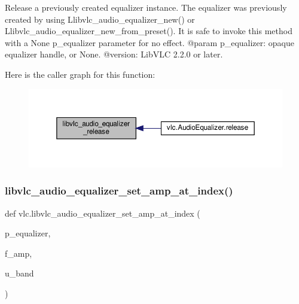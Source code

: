 \begin{DoxyVerb}Release a previously created equalizer instance.
The equalizer was previously created by using L{libvlc_audio_equalizer_new}() or
L{libvlc_audio_equalizer_new_from_preset}().
It is safe to invoke this method with a None p_equalizer parameter for no effect.
@param p_equalizer: opaque equalizer handle, or None.
@version: LibVLC 2.2.0 or later.
\end{DoxyVerb}
 Here is the caller graph for this function\+:
\nopagebreak
\begin{figure}[H]
\begin{center}
\leavevmode
\includegraphics[width=350pt]{namespacevlc_ae82eed728fae30f533e3bdaaeeb2fb24_icgraph}
\end{center}
\end{figure}
\mbox{\label{namespacevlc_afa112c9fa2e01582526543f4cc824132}} 
\subsubsection{\texorpdfstring{libvlc\+\_\+audio\+\_\+equalizer\+\_\+set\+\_\+amp\+\_\+at\+\_\+index()}{libvlc\_audio\_equalizer\_set\_amp\_at\_index()}}
{\footnotesize\ttfamily def vlc.\+libvlc\+\_\+audio\+\_\+equalizer\+\_\+set\+\_\+amp\+\_\+at\+\_\+index (\begin{DoxyParamCaption}\item[{}]{p\+\_\+equalizer,  }\item[{}]{f\+\_\+amp,  }\item[{}]{u\+\_\+band }\end{DoxyParamCaption})}

